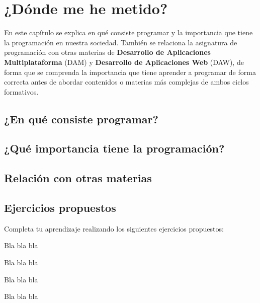 
\chapter{¿Dónde me he metido?}

En este capítulo se explica en qué consiste programar y la importancia que tiene la programación en nuestra sociedad. 
También se relaciona la asignatura de programación con otras materias de \textbf{Desarrollo de Aplicaciones Multiplataforma} (DAM)
y \textbf{Desarrollo de Aplicaciones Web} (DAW), de forma que se comprenda la importancia que tiene aprender a programar de forma correcta
antes de abordar contenidos o materias más complejas de ambos ciclos formativos.

\section{¿En qué consiste programar?}



\section{¿Qué importancia tiene la programación?}



\section{Relación con otras materias}



\section{Ejercicios propuestos}

Completa tu aprendizaje realizando los siguientes ejercicios propuestos:

\begin{exercise}
Bla bla bla
\end{exercise}

\begin{exercise}
Bla bla bla
\end{exercise}

\begin{exercise}
Bla bla bla
\end{exercise}

\begin{exercise}
Bla bla bla
\end{exercise}


